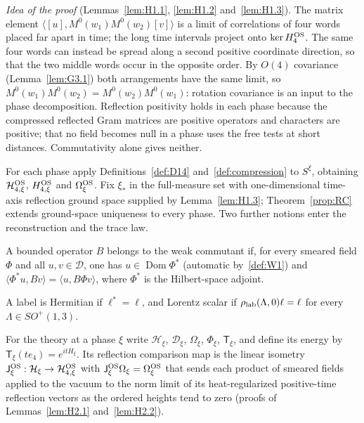 \emph{Idea of the proof} (Lemmas~\ref{lem:H1.1}, \ref{lem:H1.2} and~\ref{lem:H1.3}). The matrix element $\langle[u],M^0(w_1)M^0(w_2)[v]\rangle$ is a limit of correlations of four words placed far apart in time; the long time intervals project onto $\ker H_4^{\rm OS}$. The same four words can instead be spread along a second positive coordinate direction, so that the two middle words occur in the opposite order. By $O(4)$ covariance (Lemma~\ref{lem:G3.1}) both arrangements have the same limit, so $M^0(w_1)M^0(w_2)=M^0(w_2)M^0(w_1)$: rotation covariance is an input to the phase decomposition. Reflection positivity holds in each phase because the compressed reflected Gram matrices are positive operators and characters are positive; that no field becomes null in a phase uses the free tests at short distances. Commutativity alone gives neither.

For each phase apply Definitions~\ref{def:D14} and~\ref{def:compression} to $S^\xi$, obtaining $\mathcal H_{4,\xi}^{\rm OS}$, $H_{4,\xi}^{\rm OS}$ and $\Omega_\xi^{\rm OS}$. Fix $\xi_*$ in the full-measure set with one-dimensional time-axis reflection ground space supplied by Lemma~\ref{lem:H1.3}; Theorem~\ref{prop:RC} extends ground-space uniqueness to every phase. Two further notions enter the reconstruction and the trace law.

\begin{definition}\label{def:D14d}
A bounded operator $B$ belongs to the weak commutant if, for every smeared field $\Phi$ and all $u,v\in\mathcal D$, one has $u\in\operatorname{Dom}\Phi^*$ (automatic by~\ref{def:W1}) and $\langle\Phi^*u,Bv\rangle=\langle u,B\Phi v\rangle$, where $\Phi^*$ is the Hilbert-space adjoint.
\end{definition}

\begin{definition}\label{def:D14e}
A label is Hermitian if $\ell^*=\ell$, and Lorentz scalar if $\rho_{\rm lab}(\Lambda,0)\ell=\ell$ for every $\Lambda\in SO^+(1,3)$.
\end{definition}

For the theory at a phase $\xi$ write $\mathcal H_\xi$, $\mathcal D_\xi$, $\Omega_\xi$, $\Phi_\xi$, $\mathsf T_\xi$, and define its energy by $\mathsf T_\xi(te_4)=e^{itH_\xi}$. Its reflection comparison map is the linear isometry $\mathsf J_\xi^{\rm OS}:\mathcal H_\xi\to\mathcal H_{4,\xi}^{\rm OS}$ with $\mathsf J_\xi^{\rm OS}\Omega_\xi=\Omega_\xi^{\rm OS}$ that sends each product of smeared fields applied to the vacuum to the norm limit of its heat-regularized positive-time reflection vectors as the ordered heights tend to zero (proofs of Lemmas~\ref{lem:H2.1} and~\ref{lem:H2.2}).

